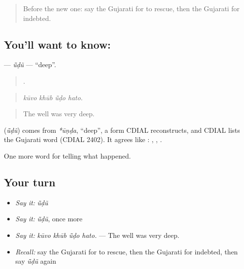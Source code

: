 \label{lesson:GU-C307-udu}



\begin{quote}
Before the new one: say the Gujarati for to rescue, then the Gujarati for indebted.
\end{quote}

\subsection*{You'll want to know: }
\textbf{} — \emph{ū̃ḍũ} — \textquotedblleft{}deep\textquotedblright{}.

\begin{quote}
   .
\end{quote}

\begin{quote}
\emph{kūvo khūb ū̃ḍo hato.}
\end{quote}

\begin{quote}
The well was very deep.
\end{quote}

\begin{cousinweb}
\textbf{} (\emph{ū̃ḍũ}) comes from \emph{*ūṇḍa}, \textquotedblleft{}deep\textquotedblright{}, a form CDIAL reconstructs, and CDIAL lists the Gujarati word (CDIAL 2402). It agrees like \textbf{}: \textbf{ }, \textbf{ }, \textbf{ }.
\end{cousinweb}

\begin{grammarlens}[title={What you've built}]
One more word for telling what happened.
\end{grammarlens}

\subsection*{Your turn}
\begin{itemize}
\raggedright
  \item \emph{Say it:} \emph{ū̃ḍũ}
  \item \emph{Say it:} \emph{ū̃ḍũ}, once more
  \item \emph{Say it:} \emph{kūvo khūb ū̃ḍo hato.} — The well was very deep.
  \item \emph{Recall:} say the Gujarati for to rescue, then the Gujarati for indebted, then say \emph{ū̃ḍũ} again
\end{itemize}

